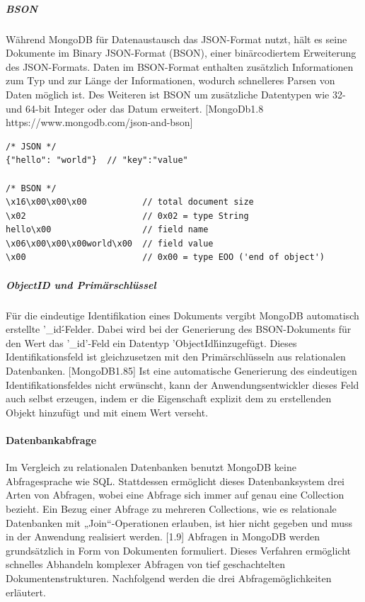 \subparagraph{BSON}
Während MongoDB für Datenaustausch das JSON-Format nutzt, hält es seine Dokumente im Binary JSON-Format (BSON), einer binärcodiertem Erweiterung des JSON-Formats. Daten im BSON-Format enthalten zusätzlich Informationen zum Typ und zur Länge der Informationen, wodurch schnelleres Parsen von Daten möglich ist. Des Weiteren ist BSON um zusätzliche Datentypen wie 32- und 64-bit Integer oder das Datum erweitert. [MongoDb1.8 https://www.mongodb.com/json-and-bson] 
\newline

\begin{lstlisting}[caption=JSON - BSON Vergleich, label=lst:JSONBSON]
/* JSON */
{"hello": "world"}  // "key":"value"

/* BSON */
\x16\x00\x00\x00           // total document size
\x02                       // 0x02 = type String
hello\x00                  // field name
\x06\x00\x00\x00world\x00  // field value
\x00                       // 0x00 = type EOO ('end of object')
\end{lstlisting}



\subparagraph{ObjectID und Primärschlüssel}
Für die eindeutige Identifikation eines Dokuments vergibt MongoDB automatisch erstellte '\_id\'-Felder. Dabei wird bei der Generierung des BSON-Dokuments für den Wert das '\_id'-Feld ein Datentyp 'ObjectId\'  hinzugefügt. Dieses Identifikationsfeld ist gleichzusetzen mit den Primärschlüsseln aus relationalen Datenbanken. [MongoDB1.85] Ist eine automatische Generierung des eindeutigen Identifikationsfeldes nicht erwünscht, kann der Anwendungsentwickler dieses Feld auch selbst erzeugen, indem er die Eigenschaft explizit dem zu erstellenden Objekt hinzufügt und mit einem Wert verseht. 
\newline


\paragraph{Datenbankabfrage}
Im Vergleich zu relationalen Datenbanken benutzt MongoDB keine Abfragesprache wie SQL. Stattdessen ermöglicht dieses Datenbanksystem drei Arten von Abfragen, wobei eine Abfrage sich immer auf genau eine Collection bezieht. Ein Bezug einer Abfrage zu mehreren Collections, wie es relationale Datenbanken mit „Join“-Operationen erlauben, ist hier nicht gegeben und muss in der Anwendung realisiert werden. [1.9] Abfragen in MongoDB werden grundsätzlich in Form von Dokumenten formuliert. Dieses Verfahren ermöglicht schnelles Abhandeln komplexer Abfragen von tief geschachtelten Dokumentenstrukturen. Nachfolgend werden die drei Abfragemöglichkeiten erläutert.


